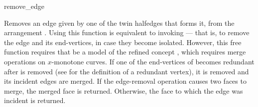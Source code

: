 \ccRefPageBegin

\begin{ccRefFunction}{remove_edge}

\ccDefinition

Removes an edge given by one of the twin halfedges  that forms it,
from the arrangement . Using this function is equivalent to
invoking  --- that is, to remove the
edge and its end-vertices, in case they become isolated. However, this
free function requires that  be a model of the refined concept
, which requires merge operations
on $x$-monotone curves. If one of the end-vertices of  becomes
redundant after  is removed (see  for the
definition of a redundant vertex), it is removed and its
incident edges are merged.
If the edge-removal operation causes two faces to merge, the merged face
is returned. Otherwise, the face to which the edge was incident is
returned.



\end{ccRefFunction}

\ccRefPageEnd
